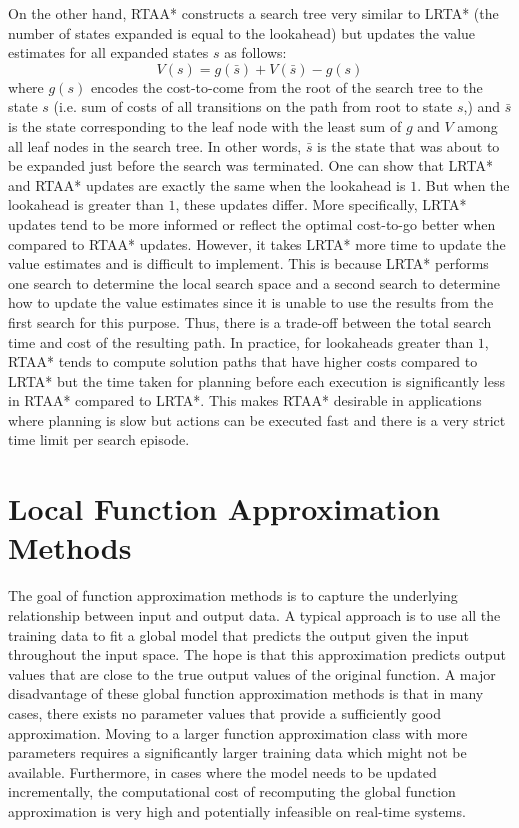 On the other hand, RTAA* constructs a search tree very similar to
LRTA* (the number of states expanded is equal to the lookahead) but
updates the value estimates for all expanded states $s$ as follows:
\begin{equation}
  \label{eq:11}
  V(s) = g(\bar{s}) + V(\bar{s}) - g(s)
\end{equation}
where $g(s)$ encodes the cost-to-come from the root of the search tree
to the state $s$ (i.e. sum of costs of all transitions on the path
from root to state $s$,) and $\bar{s}$ is the state corresponding to
the leaf node with the least sum of $g$ and $V$ among all leaf nodes
in the search tree. In other words, $\bar{s}$ is the state that was
about to be expanded just before the search was terminated. One can
show that LRTA* and RTAA* updates are exactly the same when the
lookahead is $1$. But when the lookahead is greater than $1$, these
updates differ. More specifically, LRTA* updates tend to be more
informed or reflect the optimal cost-to-go better when compared to
RTAA* updates. However, it takes LRTA* more time to update the value
estimates and is difficult to implement. This is because LRTA*
performs one search to determine the local search space and a second
search to determine how to update the value estimates since it is
unable to use the results from the first search for this
purpose. Thus, there is a trade-off between the total search time and
cost of the resulting path. In practice, for lookaheads greater than
$1$, RTAA* tends to compute solution paths that have higher costs
compared to LRTA* but the time taken for planning before each execution is
significantly less in RTAA* compared to LRTA*. This makes RTAA*
desirable in applications where planning is slow but actions can be
executed fast and there is a very strict time limit per search episode.

\section{Local Function Approximation Methods}
\label{sec:local-funct-appr-1}

The goal of function approximation methods is to capture the
underlying relationship between input and output data. A typical
approach is to use all the training data to fit a global model that
predicts the output given the input throughout the input space. The
hope is that this approximation predicts output values that are close to the
true output values of the original function. A major disadvantage of
these global function approximation methods is that in many cases,
there exists no parameter values that provide a sufficiently good
approximation. Moving to a larger function approximation class with
more parameters requires a significantly larger training data which
might not be available. Furthermore, in cases where the model needs to
be updated incrementally, the computational cost of recomputing the
global function approximation is very high and potentially infeasible
on real-time systems.


